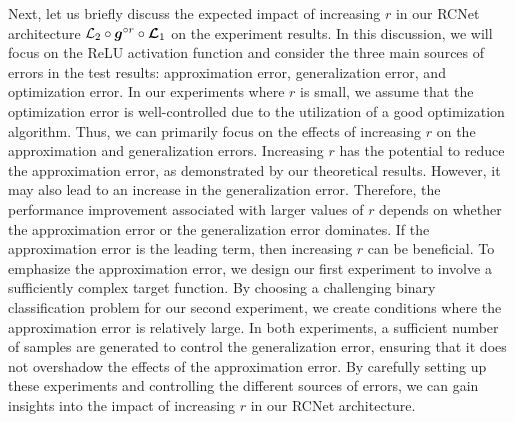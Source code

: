 \documentclass[nohyperref]{article}
\theoremstyle{plain}
\theoremstyle{definition}
\theoremstyle{remark}
\begin{document}
Next, let us briefly discuss the expected impact of increasing $r$ in our RCNet architecture ${\mathcal{L}}_2\circ {\bm{g}}^{\circ r}\circ {\bm{\mathcal{L}}}_1$ on the experiment results. In this discussion, we will focus on the ReLU activation function and consider the three main sources of errors in the test results: approximation error, generalization error, and optimization error.
In our experiments where $r$ is small, we assume that the optimization error is well-controlled due to the utilization of a good optimization algorithm. Thus, we can primarily focus on the effects of increasing $r$ on the approximation and generalization errors.
Increasing $r$ has the potential to reduce the approximation error, as demonstrated by our theoretical results. However, it may also lead to an increase in the generalization error. Therefore, the performance improvement associated with larger values of $r$ depends on whether the approximation error or the generalization error dominates.
If the approximation error is the leading term, then increasing $r$ can be beneficial. To emphasize the approximation error, we design our first experiment to involve a sufficiently complex target function. By choosing a challenging binary classification problem for our second experiment, we create conditions where the approximation error is relatively large. In both experiments, a sufficient number of samples are generated to control the generalization error, ensuring that it does not overshadow the effects of the approximation error.
By carefully setting up these experiments and controlling the different sources of errors, we can gain insights into the impact of increasing $r$ in our RCNet architecture. 
\end{document}
